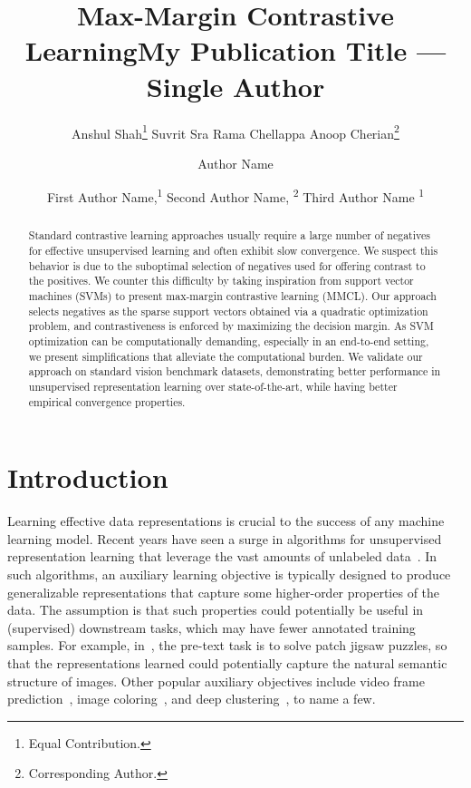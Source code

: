 \documentclass[letterpaper]{article} \usepackage{aaai22}  \usepackage{times}  \usepackage{helvet}  \usepackage{courier}  \usepackage[hyphens]{url}  \usepackage{graphicx} \urlstyle{rm} \def\UrlFont{\rm}  \usepackage{natbib}  \usepackage{caption} \DeclareCaptionStyle{ruled}{labelfont=normalfont,labelsep=colon,strut=off} \frenchspacing  \setlength{\pdfpagewidth}{8.5in}  \setlength{\pdfpageheight}{11in}
\title{Max-Margin Contrastive Learning}
\author{Anshul Shah\thanks{Equal Contribution.} \qquad Suvrit Sra \qquad Rama Chellappa \qquad  Anoop Cherian\thanks{Corresponding Author.}\\
}
\title{My Publication Title --- Single Author}
\author {
    Author Name
}
\author {
First Author Name,\textsuperscript{\rm 1}
    Second Author Name, \textsuperscript{\rm 2}
    Third Author Name \textsuperscript{\rm 1}
}
\begin{document}
\maketitle

\begin{abstract}
Standard contrastive learning approaches usually require a large number of negatives for effective unsupervised learning and often exhibit slow convergence. We suspect this behavior is due to the suboptimal selection of negatives used for offering contrast to the positives. We counter this difficulty by taking inspiration from support vector machines (SVMs) to present max-margin contrastive learning (MMCL). Our approach selects negatives as the sparse support vectors obtained via a quadratic optimization problem, and contrastiveness is enforced by maximizing the decision margin. As SVM optimization can be computationally demanding, especially in an end-to-end setting, we present simplifications that alleviate the computational burden. We validate our approach on standard vision benchmark datasets, demonstrating better performance in unsupervised representation learning over state-of-the-art, while having better empirical convergence properties. 
\end{abstract}

\section{Introduction}
Learning effective data representations is crucial to the success of any machine learning model. Recent years have seen a surge in algorithms for unsupervised representation learning that leverage the vast amounts of unlabeled data~\cite{chen2020simple,gidaris2018unsupervised,lee2017unsupervised,zhang2019aet,zhan2020online}.  In such algorithms, an auxiliary learning objective is typically designed to produce generalizable representations that capture some higher-order properties of the data. The assumption is that such properties could potentially be useful in (supervised) downstream tasks, which may have fewer annotated training samples. For example, in~\cite{noroozi2016unsupervised,santa2018visual}, the pre-text task is to solve patch jigsaw puzzles, so that the representations learned could potentially capture the natural semantic structure of images. Other popular auxiliary objectives include video frame prediction~\cite{oord2018representation}, image coloring~\cite{zhang2016colorful}, and deep clustering~\cite{caron2018deep}, to name a few.
\end{document}
